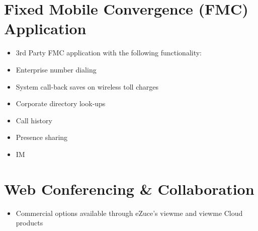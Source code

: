 \documentclass[letterpaper,10pt,english]{sphinxmanual}
\begin{document}
\section{Fixed Mobile Convergence (FMC) Application}
\label{\detokenize{features:fixed-mobile-convergence-fmc-application}}\begin{itemize}
\item {} 
3rd Party FMC application with the following functionality:

\item {} 
Enterprise number dialing

\item {} 
System call-back saves on wireless toll charges

\item {} 
Corporate directory look-ups

\item {} 
Call history

\item {} 
Presence sharing

\item {} 
IM

\end{itemize}


\section{Web Conferencing \& Collaboration}
\label{\detokenize{features:web-conferencing-collaboration}}\begin{itemize}
\item {} 
Commercial options available through eZuce’s viewme and viewme Cloud products

\end{itemize}
\end{document}
